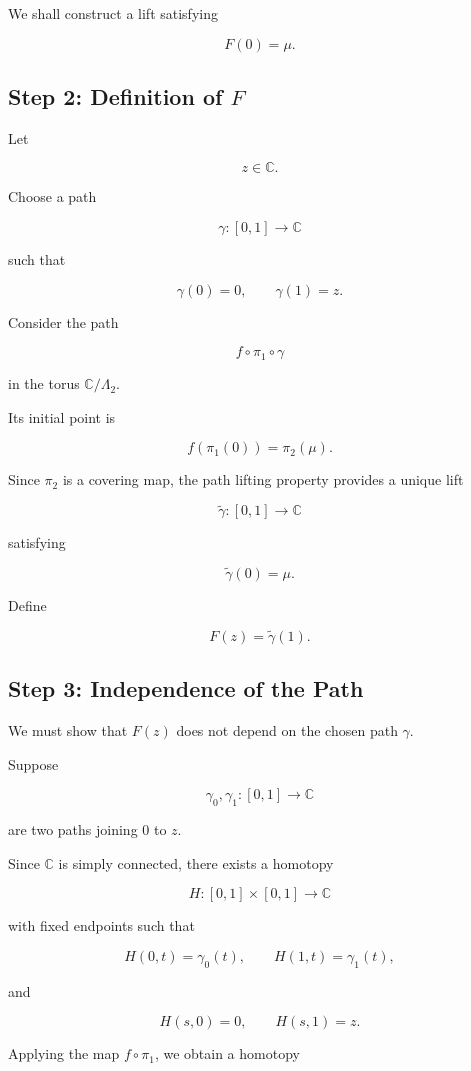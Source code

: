 \documentclass[12pt,a4paper]{article}
\theoremstyle{notespace}
\begin{document}
We shall construct a lift satisfying

\[
F(0)=\mu.
\]

\subsection{Step 2: Definition of \(F\)}

Let

\[
z\in\mathbb C.
\]

Choose a path

\[
\gamma:[0,1]\to\mathbb C
\]

such that

\[
\gamma(0)=0,
\qquad
\gamma(1)=z.
\]

Consider the path

\[
f\circ\pi_1\circ\gamma
\]

in the torus \(\mathbb C/\Lambda_2\).

Its initial point is

\[
f(\pi_1(0))
=
\pi_2(\mu).
\]

Since \(\pi_2\) is a covering map, the path lifting property provides a unique lift

\[
\widetilde{\gamma}:[0,1]\to\mathbb C
\]

satisfying

\[
\widetilde{\gamma}(0)=\mu.
\]

Define

\[
F(z)
=
\widetilde{\gamma}(1).
\]

\subsection{Step 3: Independence of the Path}

We must show that \(F(z)\) does not depend on the chosen path \(\gamma\).

Suppose

\[
\gamma_0,\gamma_1:[0,1]\to\mathbb C
\]

are two paths joining \(0\) to \(z\).

Since \(\mathbb C\) is simply connected, there exists a homotopy

\[
H:[0,1]\times[0,1]\to\mathbb C
\]

with fixed endpoints such that

\[
H(0,t)=\gamma_0(t),
\qquad
H(1,t)=\gamma_1(t),
\]

and

\[
H(s,0)=0,
\qquad
H(s,1)=z.
\]

Applying the map \(f\circ\pi_1\), we obtain a homotopy
\end{document}
